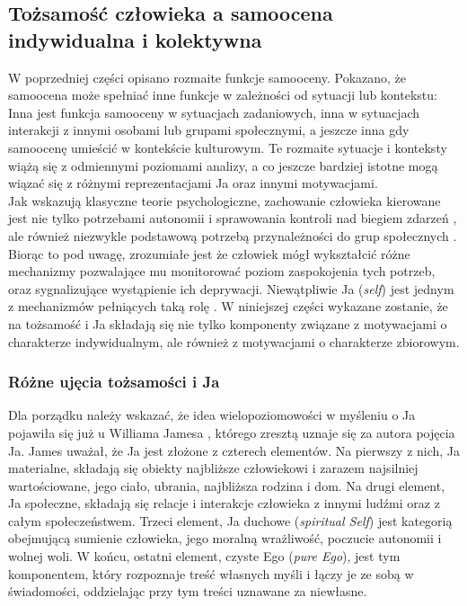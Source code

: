 \documentclass[man]{apa6}
\begin{document}
\newpage

\subsection{Tożsamość człowieka a samoocena indywidualna i kolektywna}

W poprzedniej części opisano rozmaite funkcje samooceny. Pokazano, że samoocena może spełniać inne funkcje w zależności od sytuacji lub kontekstu: Inna jest funkcja samooceny w sytuacjach zadaniowych, inna w sytuacjach interakcji z innymi osobami lub grupami społecznymi, a jeszcze inna gdy samoocenę umieścić w kontekście kulturowym. Te rozmaite sytuacje i konteksty wiążą się z odmiennymi poziomami analizy, a co jeszcze bardziej istotne mogą wiązać się z różnymi reprezentacjami Ja \parencite{brewer1996we} oraz innymi motywacjami.\\

Jak wskazują klasyczne teorie psychologiczne, zachowanie człowieka kierowane jest nie tylko potrzebami autonomii i sprawowania kontroli nad biegiem zdarzeń \parencite[np.,][]{wortman1975responses, deci2000and}, ale również niezwykle podstawową potrzebą przynależności do grup społecznych \parencite{baumeister1995need}. Biorąc to pod uwagę, zrozumiałe jest że człowiek mógł wykształcić różne mechanizmy pozwalające mu monitorować poziom zaspokojenia tych potrzeb, oraz sygnalizujące wystąpienie ich deprywacji. Niewątpliwie Ja (\emph{self}) jest jednym z mechanizmów pełniących taką rolę \parencite[patrz,][]{higgins1989self, higgins1996self}. W niniejszej części wykazane zostanie, że na tożsamość i Ja składają się nie tylko komponenty związane z motywacjami o charakterze indywidualnym, ale również z motywacjami o charakterze zbiorowym.\\

\subsubsection{Różne ujęcia tożsamości i Ja}

Dla porządku należy wskazać, że idea wielopoziomowości w myśleniu o Ja pojawiła się już u Williama Jamesa \parencite{james1890principles}, którego zresztą uznaje się za autora pojęcia Ja. James uważał, że Ja jest złożone z czterech elementów. Na pierwszy z nich, Ja materialne, składają się obiekty najbliższe człowiekowi i zarazem najsilniej wartościowane, jego ciało, ubrania, najbliższa rodzina i dom. Na drugi element, Ja społeczne, składają się relacje i interakcje człowieka z innymi ludźmi oraz z całym społeczeństwem. Trzeci element, Ja duchowe (\emph{spiritual Self}) jest kategorią obejmującą sumienie człowieka, jego moralną wrażliwość, poczucie autonomii i wolnej woli. W końcu, ostatni element, czyste Ego (\emph{pure Ego}), jest tym komponentem, który rozpoznaje treść własnych myśli i łączy je ze sobą w świadomości, oddzielając przy tym treści uznawane za niewłasne.\\
\end{document}
